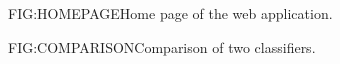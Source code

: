 \begin{figure}[Web Application Home Page]{FIG:HOMEPAGE}{Home page of the web application.}
\end{figure}

\begin{figure}[Web Application Comparison]{FIG:COMPARISON}{Comparison of two classifiers.}
\end{figure}